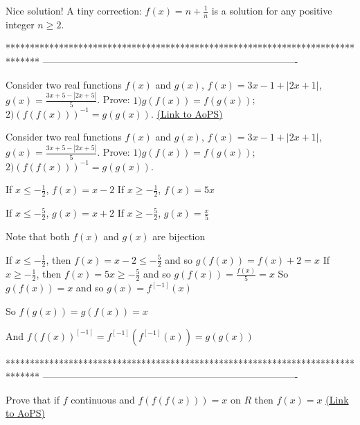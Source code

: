 \begin{solution}
	Nice solution!
A tiny correction: $f(x)=n+\frac1n$ is a solution for any positive integer $n\ge2$.
\end{solution}
*******************************************************************************
-------------------------------------------------------------------------------

\begin{problem}
	Consider two real functions $f(x)$ and $g(x)$, $f(x)=3x-1+|2x+1|$, $g(x)=\frac{3x+5-|2x+5|}{5}$. Prove:
$1) g(f(x))=f(g(x))$; 
$2) (f(f(x)))^{-1}=g(g(x))$.
	\flushright \href{https://artofproblemsolving.com/community/c6h548597}{(Link to AoPS)}
\end{problem}



\begin{solution}
	\begin{tcolorbox}Consider two real functions $f(x)$ and $g(x)$, $f(x)=3x-1+|2x+1|$, $g(x)=\frac{3x+5-|2x+5|}{5}$. Prove:
$1) g(f(x))=f(g(x))$; 
$2) (f(f(x)))^{-1}=g(g(x))$.\end{tcolorbox}
If $x\le -\frac 12$, $f(x)=x-2$
If $x\ge -\frac 12$, $f(x)=5x$

If $x\le -\frac 52$, $g(x)=x+2$
If $x\ge -\frac 52$, $g(x)=\frac x5$

Note that both $f(x)$ and $g(x)$ are bijection

If $x\le -\frac 12$, then $f(x)=x-2\le -\frac 52$ and so $g(f(x))=f(x)+2=x$
If $x\ge -\frac 12$, then $f(x)=5x\ge-\frac 52$ and so $g(f(x))=\frac{f(x)}5=x$
So $g(f(x))=x$ and so $g(x)=f^{[-1]}(x)$

So $f(g(x))=g(f(x))=x$

And $f(f(x))^{[-1]}=f^{[-1]}(f^{[-1]}(x))=g(g(x))$
\end{solution}
*******************************************************************************
-------------------------------------------------------------------------------

\begin{problem}
	Prove that if $f$ continuous and $f(f(f(x)))=x$ on $R$ then $f(x)=x$
	\flushright \href{https://artofproblemsolving.com/community/c6h549090}{(Link to AoPS)}
\end{problem}



